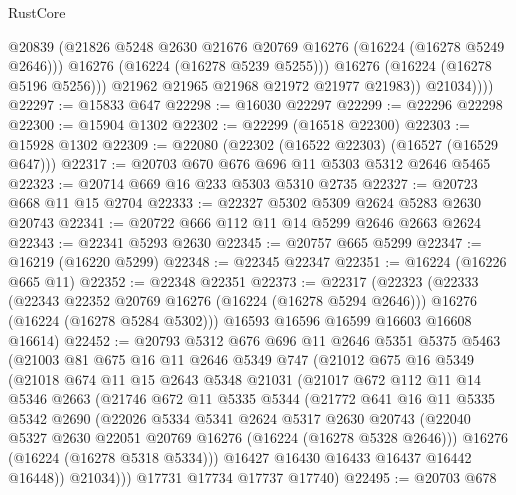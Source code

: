 \begin{lexlean}{RustCore}
\begin{coremodule}
                    @20839
                    (@21826 @5248 @2630 @21676 @20769 @16276 (@16224 (@16278 @5249 @2646)))
                    @16276
                    (@16224 (@16278 @5239 @5255)))
                  @16276
                  (@16224 (@16278 @5196 @5256)))
                @21962
                @21965
                @21968
                @21972
                @21977
                @21983))
            @21034))))
@22297 := @15833 @647
@22298 := @16030 @22297
@22299 := @22296 @22298
@22300 := @15904 @1302
@22302 := @22299 (@16518 @22300)
@22303 := @15928 @1302
@22309 := @22080 (@22302 (@16522 @22303) (@16527 (@16529 @647)))
@22317 := @20703 @670 @676 @696 @11 @5303 @5312 @2646 @5465
@22323 := @20714 @669 @16 @233 @5303 @5310 @2735
@22327 := @20723 @668 @11 @15 @2704
@22333 := @22327 @5302 @5309 @2624 @5283 @2630 @20743
@22341 := @20722 @666 @112 @11 @14 @5299 @2646 @2663 @2624
@22343 := @22341 @5293 @2630
@22345 := @20757 @665 @5299
@22347 := @16219 (@16220 @5299)
@22348 := @22345 @22347
@22351 := @16224 (@16226 @665 @11)
@22352 := @22348 @22351
@22373 := @22317
    (@22323
      (@22333
        (@22343 @22352 @20769 @16276 (@16224 (@16278 @5294 @2646)))
        @16276
        (@16224 (@16278 @5284 @5302)))
      @16593
      @16596
      @16599
      @16603
      @16608
      @16614)
@22452 := @20793
    @5312
    @676
    @696
    @11
    @2646
    @5351
    @5375
    @5463
    (@21003
      @81
      @675
      @16
      @11
      @2646
      @5349
      @747
      (@21012
        @675
        @16
        @5349
        (@21018
          @674
          @11
          @15
          @2643
          @5348
          @21031
          (@21017
            @672
            @112
            @11
            @14
            @5346
            @2663
            (@21746
              @672
              @11
              @5335
              @5344
              (@21772
                @641
                @16
                @11
                @5335
                @5342
                @2690
                (@22026
                  @5334
                  @5341
                  @2624
                  @5317
                  @2630
                  @20743
                  (@22040 @5327 @2630 @22051 @20769 @16276 (@16224 (@16278 @5328 @2646)))
                  @16276
                  (@16224 (@16278 @5318 @5334)))
                @16427
                @16430
                @16433
                @16437
                @16442
                @16448))
            @21034)))
      @17731
      @17734
      @17737
      @17740)
@22495 := @20703
    @678

\end{coremodule}
\end{lexlean}
